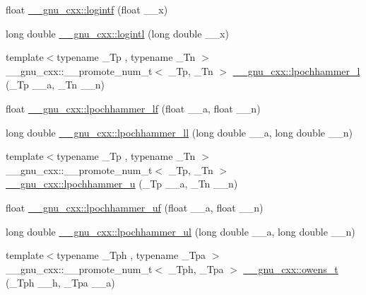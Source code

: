 \begin{DoxyCompactItemize}
\item 
float \hyperlink{group__gnu__math__spec__func_gab878da3ba2f5c1d49d96eadde533b233}{\+\_\+\+\_\+gnu\+\_\+cxx\+::logintf} (float \+\_\+\+\_\+x)
\item 
long double \hyperlink{group__gnu__math__spec__func_gab17f5cadc8f77ba2666d0d5ecc78de5d}{\+\_\+\+\_\+gnu\+\_\+cxx\+::logintl} (long double \+\_\+\+\_\+x)
\item 
{\footnotesize template$<$typename \+\_\+\+Tp , typename \+\_\+\+Tn $>$ }\\\+\_\+\+\_\+gnu\+\_\+cxx\+::\+\_\+\+\_\+promote\+\_\+num\+\_\+t$<$ \+\_\+\+Tp, \+\_\+\+Tn $>$ \hyperlink{group__gnu__math__spec__func_ga5a60fbbf559aa86dfe918d9ef23e8a74}{\+\_\+\+\_\+gnu\+\_\+cxx\+::lpochhammer\+\_\+l} (\+\_\+\+Tp \+\_\+\+\_\+a, \+\_\+\+Tn \+\_\+\+\_\+n)
\item 
float \hyperlink{group__gnu__math__spec__func_gafb9f3fc457d83f83769297fb172397d6}{\+\_\+\+\_\+gnu\+\_\+cxx\+::lpochhammer\+\_\+lf} (float \+\_\+\+\_\+a, float \+\_\+\+\_\+n)
\item 
long double \hyperlink{group__gnu__math__spec__func_ga6ba405212d353633ef5ee41f683c4630}{\+\_\+\+\_\+gnu\+\_\+cxx\+::lpochhammer\+\_\+ll} (long double \+\_\+\+\_\+a, long double \+\_\+\+\_\+n)
\item 
{\footnotesize template$<$typename \+\_\+\+Tp , typename \+\_\+\+Tn $>$ }\\\+\_\+\+\_\+gnu\+\_\+cxx\+::\+\_\+\+\_\+promote\+\_\+num\+\_\+t$<$ \+\_\+\+Tp, \+\_\+\+Tn $>$ \hyperlink{group__gnu__math__spec__func_ga85e5565a30599065b8ccbc499c5d0d85}{\+\_\+\+\_\+gnu\+\_\+cxx\+::lpochhammer\+\_\+u} (\+\_\+\+Tp \+\_\+\+\_\+a, \+\_\+\+Tn \+\_\+\+\_\+n)
\item 
float \hyperlink{group__gnu__math__spec__func_ga023cc1af92f09d35fc84a19119108980}{\+\_\+\+\_\+gnu\+\_\+cxx\+::lpochhammer\+\_\+uf} (float \+\_\+\+\_\+a, float \+\_\+\+\_\+n)
\item 
long double \hyperlink{group__gnu__math__spec__func_ga44db837251d1d0db819b0215c98f569e}{\+\_\+\+\_\+gnu\+\_\+cxx\+::lpochhammer\+\_\+ul} (long double \+\_\+\+\_\+a, long double \+\_\+\+\_\+n)
\item 
{\footnotesize template$<$typename \+\_\+\+Tph , typename \+\_\+\+Tpa $>$ }\\\+\_\+\+\_\+gnu\+\_\+cxx\+::\+\_\+\+\_\+promote\+\_\+num\+\_\+t$<$ \+\_\+\+Tph, \+\_\+\+Tpa $>$ \hyperlink{group__gnu__math__spec__func_ga7a52e8d5df5b110810c4bdba78a9d2ae}{\+\_\+\+\_\+gnu\+\_\+cxx\+::owens\+\_\+t} (\+\_\+\+Tph \+\_\+\+\_\+h, \+\_\+\+Tpa \+\_\+\+\_\+a)

\end{DoxyCompactItemize}
